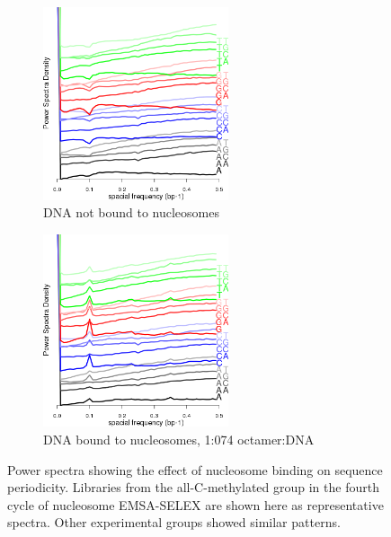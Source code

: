 \documentclass[a4paper, numbers=noenddot]{scrbook}
\begin{document}
\begin{figure}[htbp]
  \centering
  \begin{subfigure}[htbp]{0.6\textwidth}
    \centering
    \includegraphics[width=0.6\textwidth]{emsa_g7_power}
    \caption{DNA not bound to nucleosomes}
    \label{fig:powerspectra_unbound}
  \end{subfigure}
  \begin{subfigure}[htbp]{0.6\textwidth}
    \centering
    \includegraphics[width=0.6\textwidth]{emsa_g8_power}
    \caption{DNA bound to nucleosomes, 1:074 octamer:DNA}
    \label{fig:powerspectra_bound}
  \end{subfigure}
  \caption{Power spectra showing the effect of nucleosome binding on sequence periodicity.  Libraries from the all-C-methylated group in the fourth cycle of nucleosome EMSA-SELEX are shown here as representative spectra.  Other experimental groups showed similar patterns.}
  \label{fig:powerspectra}
\end{figure}
\end{document}
